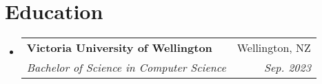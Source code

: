 \documentclass[letterpaper,11pt]{article}
\makeatletter
\newcommand{\resumeSubheading}[4]{
  \vspace{-2pt}\item
    \begin{tabular*}{0.97\textwidth}[t]{l@{\extracolsep{\fill}}r}
      \textbf{#1} & #2 \\
      \textit{\small#3} & \textit{\small #4} \\
    \end{tabular*}\vspace{-7pt}
}
\newcommand{\resumeSubHeadingListStart}{\begin{itemize}[leftmargin=0.15in, label={}]}
\newcommand{\resumeSubHeadingListEnd}{\end{itemize}}
\makeatother
\begin{document}
\section{Education}
  \resumeSubHeadingListStart
    \resumeSubheading
      {Victoria University of Wellington}{Wellington, NZ}
      {Bachelor of Science in Computer Science}{Sep. 2023}
      
  \resumeSubHeadingListEnd

\end{document}
